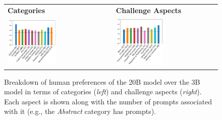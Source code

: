 \begin{figure}[ht!]
    \centering
    \footnotesize
    \setlength\tabcolsep{2pt}
    \begin{tabular}{>{\centering\arraybackslash}p{}>{\centering\arraybackslash}p{}}
        \textbf{Categories} & \textbf{Challenge Aspects} \\
        \vspace{-0.1in}\includegraphics[width=0.48\textwidth]{figures/bcp_charts/bcp_20b_3b_breakdown_category_language.pdf} &
        \vspace{-0.1in}\includegraphics[width=0.48\textwidth]{figures/bcp_charts/bcp_20b_3b_breakdown_complexity_language.pdf} \vspace{1mm} \\
    \end{tabular} 
    \caption{
    Breakdown of human preferences of the \bdraw 20B model over the 3B model in terms of \bcpa{} categories ({\it left}) and challenge aspects ({\it right}). Each aspect is shown along with the number of prompts associated with it (e.g., the \textit{Abstract} category has \bcpabstractsize{} prompts).}
    \label{figs:bcp_20b_3b_language}
\end{figure}



